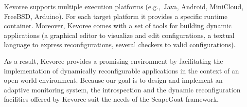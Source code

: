 Kevoree supports multiple execution platforms (e.g.,~Java, Android, MiniCloud, FreeBSD, Arduino). For each target platform it provides a specific runtime container. 
Moreover, Kevoree comes with a set of tools for building dynamic applications (a graphical editor to visualize and edit configurations, a textual language to express reconfigurations, several checkers to valid configurations). 

As a result, Kevoree provides a promising environment by facilitating the implementation of dynamically reconfigurable applications in the context of an open-world environment.
Because our goal is to design and implement an adaptive monitoring system, the introspection and the dynamic reconfiguration facilities offered by Kevoree suit the needs of the ScapeGoat framework.

%


